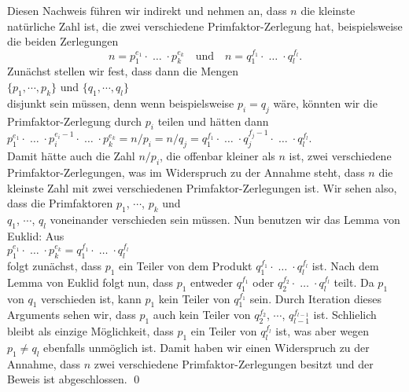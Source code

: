 Diesen Nachweis f\"{u}hren wir indirekt und nehmen an, dass $n$ die kleinste nat\"{u}rliche Zahl ist, die
zwei verschiedene Primfaktor-Zerlegung hat, beispielsweise die beiden Zerlegungen
\begin{equation}
  \label{eq:hauptsatz-arithmetik1}
n = p_1^{e_1} \cdot \;\dots\; \cdot p_k^{e_k} \quad \mbox{und} \quad
n = q_1^{f_1} \cdot \;\dots\; \cdot q_l^{f_l}.  
\end{equation}
Zun\"{a}chst stellen wir fest, dass dann die Mengen
\\[0.2cm]
\hspace*{1.3cm}
$\{p_1, \cdots, p_k\}$ \quad und \quad
$\{q_1, \cdots, q_l\}$ 
\\[0.2cm]
disjunkt sein m\"{u}ssen, denn wenn beispielsweise $p_i = q_j$ w\"{a}re, k\"{o}nnten wir die
Primfaktor-Zerlegung durch $p_i$ teilen und h\"{a}tten dann
\\[0.2cm]
\hspace*{1.3cm}
$p_1^{e_1} \cdot \;\dots\; \cdot p_i^{e_i-1} \cdot \;\dots\; \cdot p_k^{e_k} = n/p_i = n/q_j
 = q_1^{f_1} \cdot \;\dots\; \cdot q_j^{f_j-1} \cdot \;\dots\; \cdot q_l^{f_l}$.
\\[0.2cm]
Damit h\"{a}tte auch die Zahl $n/p_i$, die offenbar kleiner als $n$ ist, zwei verschiedene
Primfaktor-Zerlegungen, was im Widerspruch zu 
der Annahme steht, dass $n$ die kleinste Zahl mit zwei verschiedenen Primfaktor-Zerlegungen ist.
Wir sehen also, dass die Primfaktoren $p_1$, $\cdots$, $p_k$ und \\ $q_1$, $\cdots$, $q_l$ 
voneinander verschieden sein m\"{u}ssen.  Nun benutzen wir das Lemma von Euklid:  
Aus 
\\[0.2cm]
\hspace*{1.3cm}
$p_1^{e_1} \cdot \;\dots\; \cdot p_k^{e_k} = q_1^{f_1} \cdot \;\dots\; \cdot q_l^{f_l}$
\\[0.2cm]
folgt zun\"{a}chst, dass $p_1$ ein Teiler von dem Produkt $q_1^{f_1} \cdot \;\dots\; \cdot q_l^{f_l}$ ist.
Nach dem Lemma von Euklid folgt nun, dass $p_1$ entweder $q_1^{f_1}$ oder 
$q_2^{f_2} \cdot \;\dots\; \cdot q_l^{f_l}$ teilt.  Da $p_1$ von $q_1$ verschieden ist, kann $p_1$ kein
Teiler von $q_1^{f_1}$ sein.  Durch Iteration dieses Arguments sehen wir, dass $p_1$ auch kein
Teiler von $q_2^{f_2}$, $\cdots$, $q_{l-1}^{f_{l-1}}$ ist.  Schlie\3lich bleibt als einzige
M\"{o}glichkeit,  dass $p_1$ ein Teiler von
 $q_l^{f_l}$ ist, was aber wegen $p_1 \not= q_l$ ebenfalls unm\"{o}glich ist.
Damit haben wir einen Widerspruch zu der Annahme, dass $n$
zwei verschiedene Primfaktor-Zerlegungen besitzt und der Beweis ist abgeschlossen.
\qed
\pagebreak

